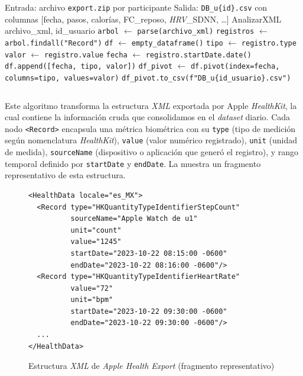 \vspace{-6pt}
\ttfamily\small
\begin{algorithmic}[1]
    \State Entrada: archivo \texttt{export.zip} por participante
    \State Salida: \texttt{DB\_u\{id\}.csv} con columnas [fecha, pasos, calorías, FC\_reposo, \textit{HRV}\_SDNN, \ldots]
    \State
    \Procedure AnalizarXML {archivo\_xml, id\_usuario}
        \State \texttt{arbol} $\gets$ \texttt{parse(archivo\_xml)}
        \State \texttt{registros} $\gets$ \texttt{arbol.findall("Record")}
        \State \texttt{df} $\gets$ \texttt{empty\_dataframe()}
                \State \texttt{tipo} $\gets$ \texttt{registro.type}
                \State \texttt{valor} $\gets$ \texttt{registro.value}
                \State \texttt{fecha} $\gets$ \texttt{registro.startDate.date()}
                \State \texttt{df.append([fecha, tipo, valor])}
            \EndIf
        \EndFor
        \State \texttt{df\_pivot} $\gets$ \texttt{df.pivot(index=fecha, columns=tipo, values=valor)}
        \State \texttt{df\_pivot.to\_csv(f"DB\_u\{id\_usuario\}.csv")}
    \EndProcedure
\end{algorithmic}
\normalfont
\vspace{-6pt}

\noindent
\begin{tabularx}{\textwidth}{@{}X@{}}
\toprule
\end{tabularx}

Este algoritmo transforma la estructura \textit{XML} exportada por Apple \textit{HealthKit}, la cual contiene la información cruda que consolidamos en el \textit{dataset} diario. Cada nodo \texttt{<Record>} encapsula una métrica biométrica con su \texttt{type} (tipo de medición según nomenclatura \textit{HealthKit}), \texttt{value} (valor numérico registrado), \texttt{unit} (unidad de medida), \texttt{sourceName} (dispositivo o aplicación que generó el registro), y rango temporal definido por \texttt{startDate} y \texttt{endDate}. La  muestra un fragmento representativo de esta estructura.

\begin{figure}[H]
    \centering
    \caption{Estructura \textit{XML} de \textit{Apple Health Export} (fragmento representativo)}
    \label{lst:xml_structure}
    \begin{minipage}{0.9\textwidth}
\begin{verbatim}
<HealthData locale="es_MX">
  <Record type="HKQuantityTypeIdentifierStepCount"
          sourceName="Apple Watch de u1"
          unit="count"
          value="1245"
          startDate="2023-10-22 08:15:00 -0600"
          endDate="2023-10-22 08:16:00 -0600"/>
  <Record type="HKQuantityTypeIdentifierHeartRate"
          value="72"
          unit="bpm"
          startDate="2023-10-22 09:30:00 -0600"
          endDate="2023-10-22 09:30:00 -0600"/>
  ...
</HealthData>
\end{verbatim}
    \end{minipage}
\end{figure}

